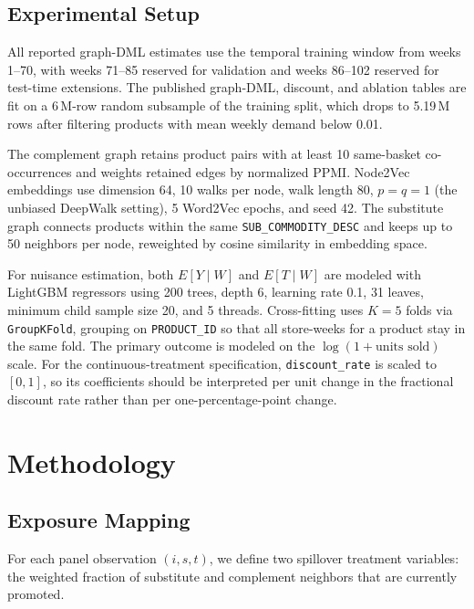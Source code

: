 \documentclass[conference]{IEEEtran}
\begin{document}
\subsection{Experimental Setup}

All reported graph-DML estimates use the temporal training window from
weeks 1--70, with weeks 71--85 reserved for validation and weeks 86--102
reserved for test-time extensions.
The published graph-DML, discount, and ablation tables are fit on a
6\,M-row random subsample of the training split, which drops to
5.19\,M rows after filtering products with mean weekly demand below 0.01.

The complement graph retains product pairs with at least 10 same-basket
co-occurrences and weights retained edges by normalized PPMI.
Node2Vec embeddings use dimension 64, 10 walks per node, walk length 80,
$p = q = 1$ (the unbiased DeepWalk setting), 5 Word2Vec epochs, and seed 42.
The substitute graph connects products within the same
\texttt{SUB\_COMMODITY\_DESC} and keeps up to 50 neighbors per node,
reweighted by cosine similarity in embedding space.

For nuisance estimation, both $E[Y \mid W]$ and $E[T \mid W]$ are modeled
with LightGBM regressors using 200 trees, depth 6, learning rate 0.1,
31 leaves, minimum child sample size 20, and 5 threads.
Cross-fitting uses $K=5$ folds via \texttt{GroupKFold}, grouping on
\texttt{PRODUCT\_ID} so that all store-weeks for a product stay in the same
fold.
The primary outcome is modeled on the $\log(1 + \text{units sold})$ scale.
For the continuous-treatment specification, \texttt{discount\_rate} is scaled
to $[0,1]$, so its coefficients should be interpreted per unit change in the
fractional discount rate rather than per one-percentage-point change.


\section{Methodology}

\subsection{Exposure Mapping}

For each panel observation $(i, s, t)$, we define two spillover treatment
variables: the weighted fraction of substitute and complement neighbors that
are currently promoted.
\end{document}
